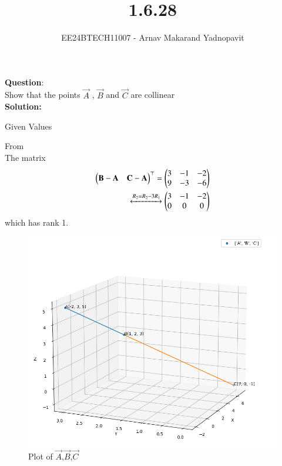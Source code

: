 \documentclass[journal]{IEEEtran}
\begin{document}

\title{1.6.28}
\author{EE24BTECH11007 - Arnav Makarand Yadnopavit}
{\let\newpage\relax\maketitle}
\renewcommand{\thefigure}{\theenumi}
\renewcommand{\thetable}{\theenumi}
\setlength{\intextsep}{10pt} %
\renewcommand{\thetable}{\theenumi}
\textbf{Question}:\\
Show that the points $\vec{A}$ , $\vec{B}$  and $\vec{C}$  are collinear\\
\textbf{Solution:}
\begin{table}[h]
    \centering
    
    \caption{Given Values}
    \label{tab:1}
\end{table}
From \\
The matrix
\begin{align}
\begin{pmatrix}\mathbf{B}-\mathbf{A} & \mathbf{C}-\mathbf{A}\end{pmatrix}^\top=\begin{pmatrix}3 & -1 & -2 \\ 9 & -3 & -6\end{pmatrix}\\
\xleftrightarrow[]{R_2=R_2-3R_1} 
\begin{pmatrix}3 & -1 & -2 \\ 0 & 0 & 0\end{pmatrix}
\end{align}
which has rank 1.
\begin{figure}[h]
    \centering
    \includegraphics[width=\columnwidth]{figs/fig.png}
    \caption{Plot of $\vec{A}$,$\vec{B}$,$\vec{C}$}
 \end{figure}
\end{document}
